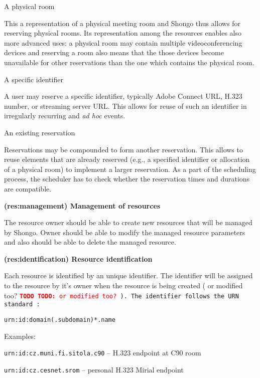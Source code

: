 \documentclass[a4paper]{report}
\makeatletter
\newcounter{UCcounter}
\newenvironment{UseCases}%
	{\begin{list}{\textbf{UC-\arabic{UCcounter}}}{\@nmbrlisttrue\def\@listctr{UCcounter}}}%
	{\end{list}}
\newcommand{\UClabel}[1]{\label{UC:#1}}
\newcommand{\UseCase}[2]{\item\UClabel{#2} \textbf{(#2) #1}\\ \nopagebreak}
\newcommand{\TODO}[1]{%
\def\empty{}%
\def\prvniparametr{#1}%
\ifx\prvniparametr\empty%
\begingroup\tt\textcolor{red}{\noindent\textbf{TODO}}\endgroup
\else%
\begingroup\tt\textcolor{red}{\noindent\textbf{TODO:}\ #1}\endgroup
\fi%
}
\makeatother
\begin{document}
\begin{UseCases}
\begin{compactdesc}
\item[A physical room]

This a representation of a physical meeting room and Shongo thus allows for
reserving physical rooms. Its representation among the resources enables also
more advanced uses: a physical room may contain multiple videoconferencing
devices and reserving a room also means that the those devices become
unavailable for other reservations than the one which contains the physical
room.

\item[A specific identifier]

A user may reserve a specific identifier, typically Adobe Connect URL, H.323
number, or streaming server URL. This allows for reuse of such an identifier in
irregularly recurring and \emph{ad hoc} events.

\item[An existing reservation]

Reservations may be compounded to form another reservation. This allows to
reuse elements that are already reserved (e.g., a specified identifier or
allocation of a physical room) to implement a larger reservation. As a part of
the scheduling process, the scheduler has to check whether the reservation
times and durations are compatible.

\end{compactdesc}


\UseCase{Management of resources}{res:management}

The resource owner should be able to create new resources that will be managed by Shongo. Owner should be able to modify the managed resource parameters and also should be able to delete the managed resource.

\UseCase{Resource identification}{res:identification}

Each resource is identified by an unique identifier. The identifier will be 
assigned to the resource by it's owner when the resource is being created 
(\TODO{or modified too?}). The identifier follows the URN standard \cite{rfc2141}:
\begin{verbatim}
urn:id:domain(.subdomain)*.name
\end{verbatim}
Examples: 
\begin{compactitem}
\item \verb|urn:id:cz.muni.fi.sitola.c90| -- H.323 endpoint at C90 room
\item \verb|urn:id:cz.cesnet.srom| -- personal H.323 Mirial endpoint
\end{compactitem}


\end{UseCases}
\end{document}
